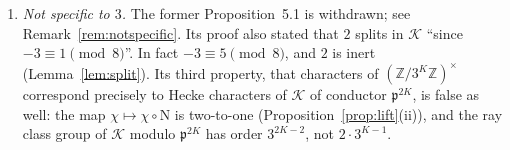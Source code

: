 \documentclass[12pt]{amsart}
\theoremstyle{plain}
\theoremstyle{definition}
\theoremstyle{remark}
\newcommand{\Z}{\mathbb{Z}}
\newcommand{\Zomega}{\Z[\omega]}
\newcommand{\K}{\mathcal{K}}          %
\newcommand{\Nf}{\mathrm{N}}          %
\newcommand{\pp}{\mathfrak{p}}        %
\begin{document}
\begin{enumerate}[label=(\arabic*)]
    false. The $(1-\omega)$-adic filtration of $\Zomega/(3^K)$ has $2K$
    steps, not three. The bound $|S(a,b;3^K)| \ll (3^K)^{3/8+\varepsilon}$
    fails, since $S(1,1;3^K) = 2\cdot 3^{K/2}\cos(4\pi/3^K)$ for even
    $K \geq 2$ (see~\cite{WakilEisenstein}); and cyclicity of
    $(\Z/\ell^K\Z)^\times$ holds for every odd prime $\ell$ and has nothing
    to do with $\Zomega$. The conductor does not match
    (Remark~\ref{rem:nolift}).
  \item \emph{Not specific to $3$.} The former Proposition~5.1 is withdrawn;
    see Remark~\ref{rem:notspecific}. Its proof also stated that $2$ splits
    in $\K$ ``since $-3 \equiv 1 \pmod 8$''. In fact $-3 \equiv 5 \pmod 8$,
    and $2$ is inert (Lemma~\ref{lem:split}). Its third property, that
    characters of $(\Z/3^K\Z)^\times$ correspond precisely to Hecke
    characters of $\K$ of conductor $\pp^{2K}$, is false as well: the map
    $\chi \mapsto \chi\circ\Nf$ is two-to-one
    (Proposition~\ref{prop:lift}(ii)), and the ray class group of $\K$
    modulo $\pp^{2K}$ has order $3^{2K-2}$, not $2\cdot 3^{K-1}$.
\end{enumerate}
\end{document}
